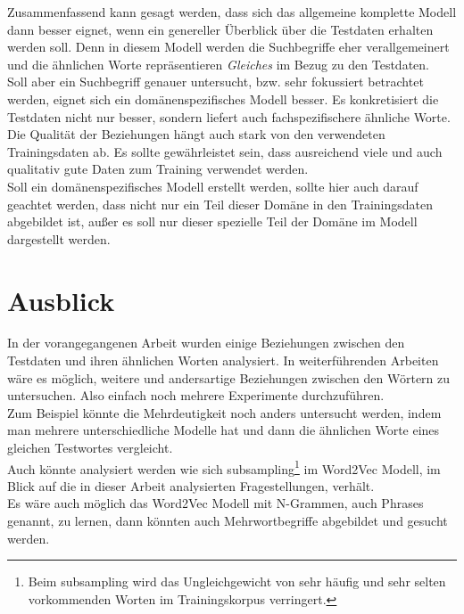 \documentclass[12pt,a4paper]{report}
\begin{document}
Zusammenfassend kann gesagt werden, dass sich das allgemeine komplette Modell dann besser eignet, wenn ein genereller Überblick über die Testdaten erhalten werden soll. Denn in diesem Modell werden die Suchbegriffe eher verallgemeinert und die ähnlichen Worte repräsentieren \textit{Gleiches} im Bezug zu den Testdaten.\\
Soll aber ein Suchbegriff genauer untersucht, bzw. sehr fokussiert betrachtet werden, eignet sich ein domänenspezifisches Modell besser. Es konkretisiert die Testdaten nicht nur besser, sondern liefert auch fachspezifischere ähnliche Worte.\\

Die Qualität der Beziehungen hängt auch stark von den verwendeten Trainingsdaten ab. Es sollte gewährleistet sein, dass ausreichend viele und auch qualitativ gute Daten zum Training verwendet werden.\\
Soll ein domänenspezifisches Modell erstellt werden, sollte hier auch darauf geachtet werden, dass nicht nur ein Teil dieser Domäne in den Trainingsdaten abgebildet ist, außer es soll nur dieser spezielle Teil der Domäne im Modell dargestellt werden.\\


\section{Ausblick}

In der vorangegangenen Arbeit wurden einige Beziehungen zwischen den Testdaten und ihren ähnlichen Worten analysiert. In weiterführenden Arbeiten wäre es möglich, weitere und andersartige Beziehungen zwischen den Wörtern zu untersuchen. Also einfach noch mehrere Experimente durchzuführen.\\
Zum Beispiel könnte die Mehrdeutigkeit noch anders untersucht werden, indem man mehrere unterschiedliche Modelle hat und dann die ähnlichen Worte eines gleichen Testwortes vergleicht.\\

Auch könnte analysiert werden wie sich subsampling\footnote{Beim subsampling wird das Ungleichgewicht von sehr häufig und sehr selten vorkommenden Worten im Trainingskorpus verringert\citep{DBLP:journals/corr/MikolovSCCD13}. } im Word2Vec Modell, im Blick auf die in dieser Arbeit analysierten Fragestellungen, verhält.\\
Es wäre auch möglich das Word2Vec Modell mit N-Grammen, auch Phrases genannt, zu lernen, dann könnten auch Mehrwortbegriffe abgebildet und gesucht werden.
\end{document}
